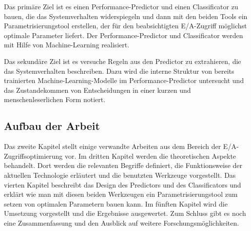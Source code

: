 
Das primäre Ziel ist es einen Performance-Predictor und einen Classificator zu bauen, die das Systemverhalten widerspiegeln und dann mit den beiden Tools ein Parametrisierungstool erstellen, der für den beabsichtigten E/A-Zugriff möglichst optimale Parameter liefert. Der Performance-Predictor und Classificator werden mit Hilfe von Machine-Learning realisiert.

Das sekundäre Ziel ist es versuche Regeln aus den Predictor zu extrahieren, die das Systemverhalten beschreiben. Dazu wird die interne Struktur von bereits trainierten Machine-Learning-Modelle im Performance-Predictor untersucht und das Zustandekommen von Entscheidungen in einer kurzen und menschenleserlichen Form notiert.


\subsection{Aufbau der Arbeit}
Das zweite Kapitel stellt einige verwandte Arbeiten aus dem Bereich der E/A-Zugriffsoptimierung vor. Im dritten Kapitel werden die theoretischen Aspekte behandelt. Dort werden die relevanten Begriffe definiert, die Funktionsweise der aktuellen Technologie erläutert und die benutzten Werkzeuge vorgestellt. 
Das vierten Kapitel beschreibt das Design des Predictors und des Classificators und erklärt wie man mit diesen beiden Werkzeugen ein Parametrisierungstool zum setzen von optimalen Parametern bauen kann.
Im fünften Kapitel wird die Umsetzung vorgestellt und die Ergebnisse ausgewertet. Zum Schluss gibt es noch eine Zusammenfassung und den Ausblick auf weitere Forschungsmöglichkeiten.
